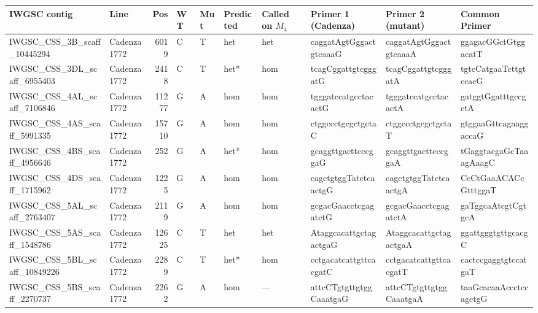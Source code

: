 \begin{tabular}{llrlllllll}
\toprule
 IWGSC contig                 & Line       &   Pos & WT   & Mut   & Predicted   & Called on $M_{4}$      & Primer 1 (Cadenza)        & Primer 2 (mutant)         & Common Primer             \\
\midrule
 IWGSC\_CSS\_3B\_scaff\_10445294  & Cadenza1772 &       6019 & C         & T        & het            & het         & caggatAgtGggactgtcaaaG    & caggatAgtGggactgtcaaaA    & ggagacGGctGtggacatT       \\
 IWGSC\_CSS\_3DL\_scaff\_6955403  & Cadenza1772 &       2418 & C         & T        & het*           & hom         & tcagCggattgtcgggatG       & tcagCggattgtcgggatA       & tgtcCatgaaTcttgtccacG     \\
 IWGSC\_CSS\_4AL\_scaff\_7106846  & Cadenza1772 &      11277 & G         & A        & hom            & hom         & tgggatccatgcctacactG      & tgggatccatgcctacactA      & gatggtGgatttgccgctA       \\
 IWGSC\_CSS\_4AS\_scaff\_5991335  & Cadenza1772 &      15710 & G         & A        & hom            & hom         & ctggccctgcgctgctaC        & ctggccctgcgctgctaT        & gtggaaGttcagaaggaccaG     \\
 IWGSC\_CSS\_4BS\_scaff\_4956646  & Cadenza1772 &        252 & G         & A        & het*           & hom         & gcaggttgacttcccggaG       & gcaggttgacttcccggaA       & tGaggtacgaGcTaaagAaagC    \\
 IWGSC\_CSS\_4DS\_scaff\_1715962  & Cadenza1772 &       1225 & G         & A        & hom            & hom         & cagctgtggTatctcaactgG     & cagctgtggTatctcaactgA     & CcCtGaaACACcGtttggaT      \\
 IWGSC\_CSS\_5AL\_scaff\_2763407  & Cadenza1772 &       2119 & G         & A        & hom            & hom         & gcgacGaacctcgagatctG      & gcgacGaacctcgagatctA      & gaTggcaAtcgtCgtgcA        \\
 IWGSC\_CSS\_5AS\_scaff\_1548786  & Cadenza1772 &      12625 & C         & T        & het            & het         & AtaggcacattgctagactgaG    & AtaggcacattgctagactgaA    & ggattgggtgttgcacgC        \\
 IWGSC\_CSS\_5BL\_scaff\_10849226 & Cadenza1772 &       2289 & C         & T        & het*           & hom         & cctgacatcattgttcacgatC    & cctgacatcattgttcacgatT    & cactccgaggtgtccatgaT      \\
 IWGSC\_CSS\_5BS\_scaff\_2270737  & Cadenza1772 &       2262 & G         & A        & hom            & ---         & attcCTgtgttgtggCaaatgaG   & attcCTgtgttgtggCaaatgaA   & taaGcacaaAccctccagctgG    \\

\end{tabular}
